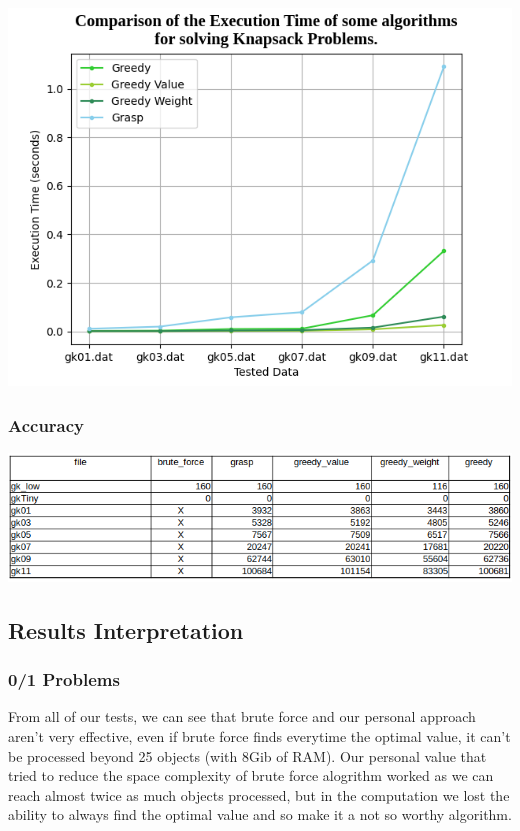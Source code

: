 \documentclass[a4paper, 11pt]{article}
\begin{document}
    \includegraphics[scale = 0.5]{graph_multi_gk_greed.png}


    \subsubsection{Accuracy}

    \includegraphics[scale = 0.5]{values_multidim.png}

    \subsection{Results Interpretation}

    \subsubsection{0/1 Problems}

        From all of our tests, we can see that brute force and our personal approach aren't very effective, even if brute force finds everytime the optimal value, it can't be processed beyond 25 objects (with 8Gib of RAM). Our personal value that tried to reduce the space complexity of brute force alogrithm worked as we can reach almost twice as much objects processed, but in the computation we lost the ability to always find the optimal value and so make it a not so worthy algorithm.\par
\end{document}
